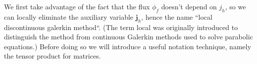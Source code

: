 \documentclass[a4paper,12pt]{scrartcl}
\renewcommand{\vec}[1]{{\mathbf{#1}}}
\begin{document}
We first take advantage of the fact that the flux $\phi_f$ doesn't 
depend on $j_h$, so we can locally eliminate the auxiliary 
variable $\vec j_h$, hence the name ``local discontinuous galerkin method``.
(The term local was originally introduced to distinguish the 
method from continuous Galerkin methods used to solve parabolic equations.)
Before doing so we will introduce a useful notation technique, namely the
tensor product for matrices.
\end{document}

